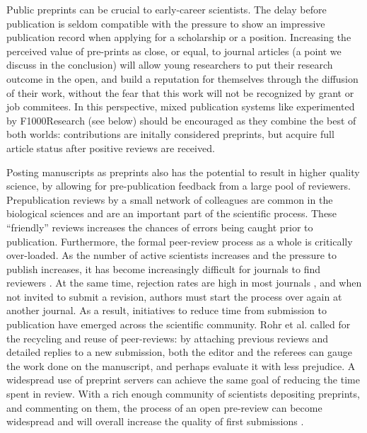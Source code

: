 \documentclass[letterpaper,twocolumn,superscriptaddress,showkeys,longbibliography]{revtex4-1}
\begin{document}
Public preprints can be crucial to early-career scientists. The delay before
publication is seldom compatible with the pressure to show an impressive
publication record when applying for a scholarship or a position. Increasing
the perceived value of pre-prints as close, or equal, to journal articles (a
point we discuss in the conclusion) will allow young researchers to put their
research outcome in the open, and build a reputation for themselves through
the diffusion of their work, without the fear that this work will not be
recognized by grant or job commitees. In this perspective, mixed publication
systems like experimented by F1000Research (see below) should be encouraged as
they combine the best of both worlds: contributions are initally considered
preprints, but acquire full article status after positive reviews are
received.

Posting manuscripts as preprints also has the potential to result in higher
quality science, by allowing for pre-publication feedback from a large pool of
reviewers. Prepublication reviews by a small network of colleagues are common in
the biological sciences and are an important part of the scientific process.
These ``friendly'' reviews increases the chances of errors being caught prior to
publication. Furthermore, the formal peer-review process as a whole is
critically over-loaded. As the number of active scientists increases and the
pressure to publish increases, it has become increasingly difficult for journals
to find reviewers \cite{hoc09}.  At the same time, rejection rates are high in
most journals \cite{aar08,roh09}, and when not invited to submit a revision,
authors must start the process over again at another journal. As a result,
initiatives to reduce time from submission to publication have emerged across
the scientific community. Rohr et al.  \cite{roh09} called for the recycling and
reuse of peer-reviews: by attaching previous reviews and detailed replies to a
new submission, both the editor and the referees can gauge the work done on the
manuscript, and perhaps evaluate it with less prejudice. A widespread use of
preprint servers can achieve the same goal of reducing the time spent in review.
With a rich enough community of scientists depositing preprints, and commenting
on them, the process of an open pre-review can become widespread and will
overall increase the quality of first submissions \cite{hoc12}.
\end{document}
